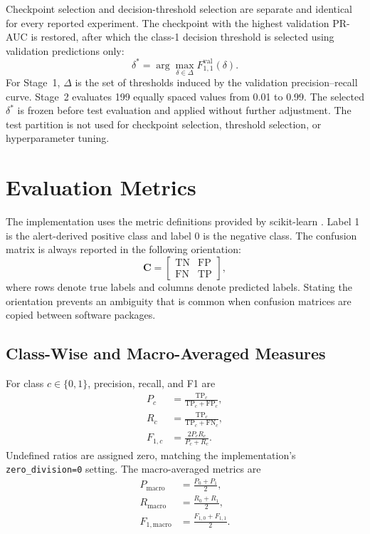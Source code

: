 \documentclass[11pt,fleqn]{report}
\begin{document}
Checkpoint selection and decision-threshold selection are separate and identical for every reported experiment. The checkpoint with the highest validation PR-AUC is restored, after which the class-1 decision threshold is selected using validation predictions only:
\begin{equation}
    \delta^{*}
    =\arg\max_{\delta\in\Delta}
      F_{1,1}^{\mathrm{val}}(\delta).
    \label{eq:validation_threshold_selection}
\end{equation}
For Stage~1, $\Delta$ is the set of thresholds induced by the validation precision--recall curve. Stage~2 evaluates 199 equally spaced values from 0.01 to 0.99. The selected $\delta^{*}$ is frozen before test evaluation and applied without further adjustment. The test partition is not used for checkpoint selection, threshold selection, or hyperparameter tuning.

\section{Evaluation Metrics}
\label{subsec:experimental_metrics}

The implementation uses the metric definitions provided by scikit-learn \cite{Pedregosa2011ScikitLearn}. Label 1 is the alert-derived positive class and label 0 is the negative class. The confusion matrix is always reported in the following orientation:
\begin{equation}
    \mathbf{C}=
    \begin{bmatrix}
        \mathrm{TN} & \mathrm{FP}\\
        \mathrm{FN} & \mathrm{TP}
    \end{bmatrix},
    \label{eq:experimental_confusion_matrix}
\end{equation}
where rows denote true labels and columns denote predicted labels. Stating the orientation prevents an ambiguity that is common when confusion matrices are copied between software packages.

\subsection{Class-Wise and Macro-Averaged Measures}
\label{subsubsec:macro_metrics}

For class $c\in\{0,1\}$, precision, recall, and F1 are
\begin{align}
    P_c &= \frac{\mathrm{TP}_c}
    {\mathrm{TP}_c+\mathrm{FP}_c}, \\
    R_c &= \frac{\mathrm{TP}_c}
    {\mathrm{TP}_c+\mathrm{FN}_c}, \\
    F_{1,c} &= \frac{2P_cR_c}{P_c+R_c}.
    \label{eq:classwise_metrics}
\end{align}
Undefined ratios are assigned zero, matching the implementation's
\texttt{zero\_division=0} setting. The macro-averaged metrics are
\begin{align}
    P_{\mathrm{macro}} &= \frac{P_0+P_1}{2}, \\
    R_{\mathrm{macro}} &= \frac{R_0+R_1}{2}, \\
    F_{1,\mathrm{macro}} &= \frac{F_{1,0}+F_{1,1}}{2}.
    \label{eq:experimental_macro_metrics}
\end{align}
\end{document}
